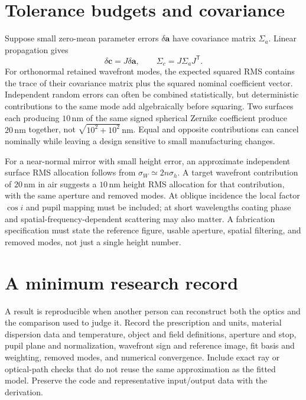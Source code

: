 \section{Tolerance budgets and covariance}
Suppose small zero-mean parameter errors $\delta\bm a$ have covariance
matrix $\Sigma_a$. Linear propagation gives
\begin{equation}
 \delta\bm c=J\delta\bm a,\qquad
 \Sigma_c=J\Sigma_aJ^{\mathsf T}.
\end{equation}
For orthonormal retained wavefront modes, the expected squared RMS contains
the trace of their covariance matrix plus the squared nominal coefficient
vector. Independent random errors can often be combined statistically,
but deterministic contributions to the same mode add algebraically before
squaring. Two surfaces each producing $10\,\mathrm{nm}$ of the same signed
spherical Zernike coefficient produce $20\,\mathrm{nm}$ together, not
$\sqrt{10^2+10^2}\,\mathrm{nm}$. Equal and opposite contributions can cancel
nominally while leaving a design sensitive to small manufacturing changes.

For a near-normal mirror with small height error, an approximate independent
surface RMS allocation follows from $\sigma_W\simeq2n\sigma_h$. A target
wavefront contribution of $20\,\mathrm{nm}$ in air suggests a
$10\,\mathrm{nm}$ height RMS allocation for that contribution, with the
same aperture and removed modes. At oblique incidence the local factor
$\cos i$ and pupil mapping must be included; at short wavelengths coating
phase and spatial-frequency-dependent scattering may also matter. A
fabrication specification must state the reference figure, usable aperture,
spatial filtering, and removed modes, not just a single height number.

\section{A minimum research record}
A result is reproducible when another person can reconstruct both the optics
and the comparison used to judge it. Record the prescription and units,
material dispersion data and temperature, object and field definitions,
aperture and stop, pupil plane and normalization, wavefront sign and reference
image, fit basis and weighting, removed modes, and numerical convergence.
Include exact ray or optical-path checks that do not reuse the same
approximation as the fitted model. Preserve the code and representative
input/output data with the derivation.

